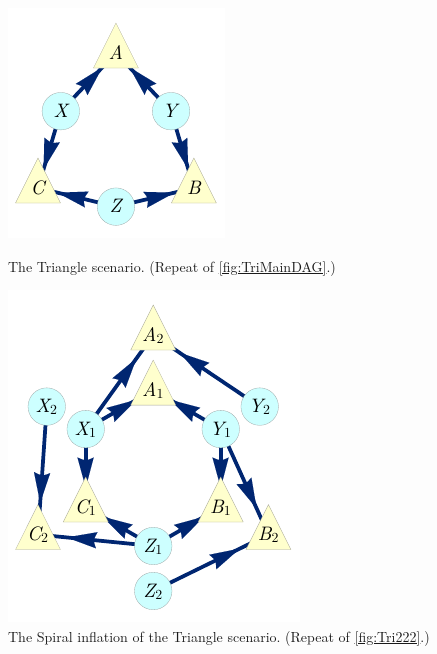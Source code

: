 \par\smallskip\nobreak
\begin{figure}[bh]
\centering
\begin{minipage}[t]{0.45\linewidth}
\centering
\includegraphics[scale=1]{TriDagRawALT.pdf}
\caption{The Triangle scenario. (Repeat of \cref{fig:TriMainDAG}.)}\label{fig:TriMainDAGv3}
\end{minipage}
\hfill
\begin{minipage}[t]{0.45\linewidth}
\centering
\includegraphics[scale=1]{TriDagSub222fixedcoordALT.pdf}
\caption{The Spiral inflation of the Triangle scenario. (Repeat of \cref{fig:Tri222}.)}\label{fig:Tri222v2}
\end{minipage}
\end{figure}


